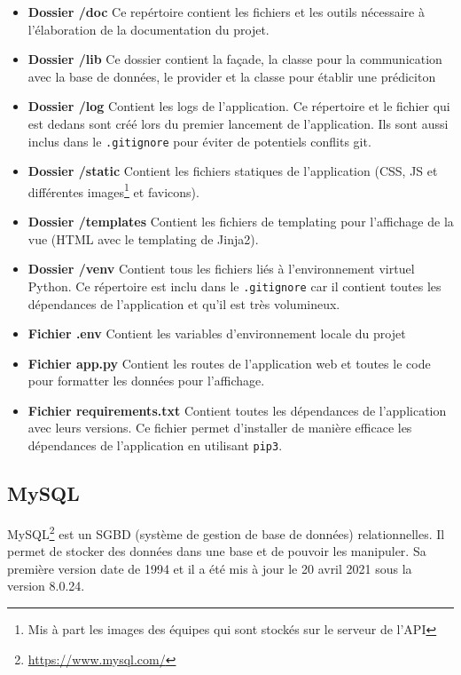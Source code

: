 \documentclass[a4paper,14pt]{extarticle}
\begin{document}
{\begin{itemize}
    \item \textbf{Dossier /doc} Ce repértoire contient les fichiers et les outils nécessaire à l'élaboration de la documentation du projet.
    \item \textbf{Dossier /lib} Ce dossier contient la façade, la classe pour la communication avec la base de données, le provider et la classe pour établir une prédiciton
    \item \textbf{Dossier /log} Contient les logs de l'application. Ce répertoire et le fichier qui est dedans sont créé lors du premier lancement de l'application. Ils sont aussi inclus dans le \texttt{.gitignore} pour éviter de potentiels conflits git.
    \item \textbf{Dossier /static} Contient les fichiers statiques de l'application (CSS, JS et différentes images\footnote{Mis à part les images des équipes qui sont stockés sur le serveur de l'API} et favicons).
    \item \textbf{Dossier /templates} Contient les fichiers de templating pour l'affichage de la vue (HTML avec le templating de Jinja2).
    \item \textbf{Dossier /venv} Contient tous les fichiers liés à l'environnement virtuel Python. Ce répertoire est inclu dans le \texttt{.gitignore} car il contient toutes les dépendances de l'application et qu'il est très volumineux.
    \item \textbf{Fichier .env} Contient les variables d'environnement locale du projet
    \item \textbf{Fichier app.py} Contient les routes de l'application web et toutes le code pour formatter les données pour l'affichage.
    \item \textbf{Fichier requirements.txt} Contient toutes les dépendances de l'application avec leurs versions. Ce fichier permet d'installer de manière efficace les dépendances de l'application en utilisant \texttt{pip3}.
\end{itemize}

\subsection{MySQL}

MySQL\footnote{\url{https://www.mysql.com/}} est un SGBD (système de gestion de base de données) relationnelles. Il permet de stocker des données dans une base et de pouvoir les manipuler. Sa première version date de 1994 et il a été mis à jour le 20 avril 2021 sous la version 8.0.24. 


}
\end{document}
